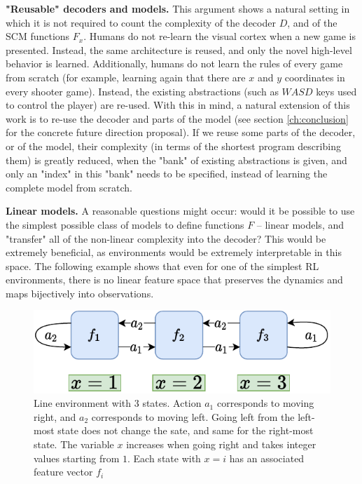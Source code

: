 \documentclass[a4paper,11pt,oneside]{report}
\begin{document}
{\bf "Reusable" decoders and models.} This argument shows a natural setting in which it is not required to count the complexity of the decoder $D$, and of the SCM functions $F_x$. Humans do not re-learn the visual cortex when a new game is presented. Instead, the same architecture is reused, and only the novel high-level behavior is learned. Additionally, humans do not learn the rules of every game from scratch (for example, learning again that there are $x$ and $y$ coordinates in every shooter game). Instead, the existing abstractions (such as $WASD$ keys used to control the player) are re-used. With this in mind, a natural extension of this work is to re-use the decoder and parts of the model (see section \ref{ch:conclusion} for the concrete future direction proposal). If we reuse some parts of the decoder, or of the model, their complexity (in terms of the shortest program describing them) is greatly reduced, when the "bank" of existing abstractions is given, and only an "index" in this "bank" needs to be specified, instead of learning the complete model from scratch.


{\bf Linear models.} A reasonable questions might occur: would it be possible to use the simplest possible class of models to define functions $F$ -- linear models, and "transfer" all of the non-linear complexity into the decoder? This would be extremely beneficial, as environments would be extremely interpretable in this space. The following example shows that even for one of the simplest RL environments, there is no linear feature space that preserves the dynamics and maps bijectively into observations.

\begin{figure}
    \centering
    \includegraphics[width=0.7\linewidth]{diagrams/env_line_3}
    \caption{Line environment with 3 states. Action $a_1$ corresponds to moving right, and $a_2$ corresponds to moving left. Going left from the left-most state does not change the sate, and same for the right-most state. The variable $x$ increases when going right and takes integer values starting from $1$. Each state with $x=i$ has an associated feature vector $f_i$}
    \label{fig:env_line3}
\end{figure}
\end{document}
